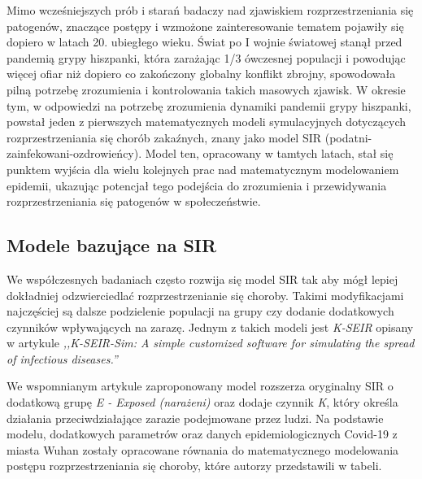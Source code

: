 Mimo wcześniejszych prób i starań badaczy nad zjawiskiem rozprzestrzeniania się patogenów, znaczące postępy i wzmożone zainteresowanie tematem pojawiły się dopiero w latach 20. ubiegłego wieku. Świat po I wojnie światowej stanął przed pandemią grypy hiszpanki, która zarażając 1/3 ówczesnej populacji i powodując więcej ofiar niż dopiero co zakończony globalny konflikt zbrojny, spowodowała pilną potrzebę zrozumienia i kontrolowania takich masowych zjawisk. W okresie tym, w odpowiedzi na potrzebę zrozumienia dynamiki pandemii grypy hiszpanki, powstał jeden z pierwszych matematycznych modeli symulacyjnych dotyczących rozprzestrzeniania się chorób zakaźnych, znany jako model SIR (podatni-zainfekowani-ozdrowieńcy). Model ten, opracowany w tamtych latach, stał się punktem wyjścia dla wielu kolejnych prac nad matematycznym modelowaniem epidemii, ukazując potencjał tego podejścia do zrozumienia i przewidywania rozprzestrzeniania się patogenów w społeczeństwie.

\subsection{\textbf{Modele bazujące na SIR}}

We współczesnych badaniach często rozwija się model SIR tak aby mógł lepiej dokładniej odzwierciedlać rozprzestrzenianie się choroby. Takimi modyfikacjami najczęściej są dalsze podzielenie populacji na grupy czy dodanie dodatkowych czynników wpływających na zarazę. Jednym z takich modeli jest \textit {K-SEIR} opisany w artykule \textit {,,K-SEIR-Sim: A simple customized software for simulating the spread of infectious diseases.''} 

We wspomnianym artykule zaproponowany model rozszerza oryginalny SIR o dodatkową grupę \textit { E - Exposed (narażeni)} oraz dodaje czynnik \textit {K}, który określa działania przeciwdziałające zarazie podejmowane przez ludzi. Na podstawie modelu, dodatkowych parametrów oraz danych epidemiologicznych Covid-19 z miasta Wuhan zostały opracowane równania do matematycznego modelowania postępu rozprzestrzeniania się choroby, które autorzy przedstawili w tabeli.

